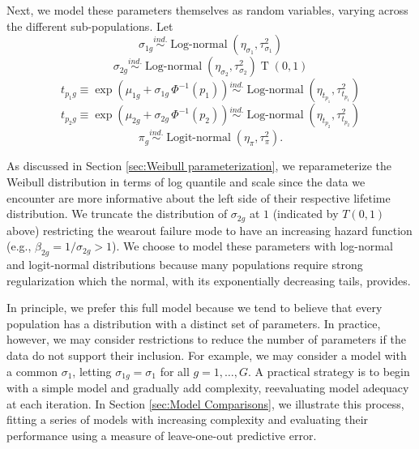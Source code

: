 \documentclass[aap]{imsart}
\newcommand{\ind}{\stackrel{ind.}{\sim}}
\newcommand{\op}{\operatorname}
\begin{document}
Next, we model these parameters themselves as random variables, varying across the different sub-populations.  Let
\begin{equation*}
\sigma_{1g} \ind \op{Log-normal} \left( \eta_{\sigma_1}, \tau^2_{\sigma_1} \right)
\end{equation*}
\begin{equation*}
\sigma_{2g} \ind \op{Log-normal} \left( \eta_{\sigma_2}, \tau^2_{\sigma_2}\right)\op{T}\left(0, 1\right)
\end{equation*}
\begin{equation}
\label{eq:hier-model}
t_{p_{1}g} \equiv \exp\left(\mu_{1g} + \sigma_{1g}\,\Phi^{-1}(p_1)\right)  \ind \op{Log-normal} \left(\eta_{t_{p_1}}, \tau^2_{t_{p_1}}\right)
\end{equation}
\begin{equation*}
t_{p_{2}g} \equiv \exp\left(\mu_{2g} + \sigma_{2g}\,\Phi^{-1}(p_2)\right)  \ind \op{Log-normal} \left(\eta_{t_{p_2}}, \tau^2_{t_{p_2}}\right)
\end{equation*}
\begin{equation*}
\pi_g \ind \op{Logit-normal}(\eta_\pi, \tau^2_\pi).
\end{equation*}

As discussed in Section \ref{sec:Weibull parameterization}, we reparameterize the Weibull distribution in terms of log quantile and scale since the data we encounter are more informative about the left side of their respective lifetime distribution. We truncate the distribution of $\sigma_{2g}$ at $1$ (indicated by $T(0,1)$ above) restricting the wearout failure mode to have an increasing hazard function (e.g., $\beta_{2g} = 1/\sigma_{2g}>1$). We choose to model these parameters with log-normal and logit-normal distributions because many populations require strong regularization which the normal, with its exponentially decreasing tails, provides. 

In principle, we prefer this full model because we tend to believe that every population has a distribution with a distinct set of parameters. In practice, however, we may consider restrictions to reduce the number of parameters if the data do not support their inclusion. For example, we may consider a model with a common $\sigma_{1}$, letting $\sigma_{1g}=\sigma_1$ for all $g=1,\ldots,G$. A practical strategy is to begin with a simple model and gradually add complexity, reevaluating model adequacy at each iteration. In Section \ref{sec:Model Comparisons}, we illustrate this process, fitting a series of models with increasing complexity and evaluating their performance using a measure of leave-one-out predictive error.
\end{document}
